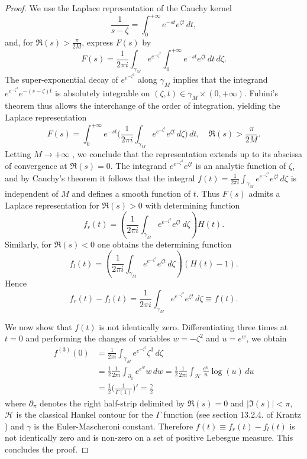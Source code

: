 \documentclass[12pt]{article}
\theoremstyle{definition}
\begin{document}
\begin{proof}
    
We use the Laplace representation of the Cauchy kernel
\[
\frac{1}{s-\zeta}
=
\int_{0}^{+ \infty}e^{-st}e^{\zeta t} \,dt,
\] 
and, for $\Re(s)> \frac{\pi}{2M}$, express $F(s)$ by
\begin{equation*}\label{eq:beforefubini}
    F(s)= \frac{1}{2 \pi i}\int_{\gamma_M}e^{e^{-\zeta^2}}\int_{0}^{+ \infty}e^{-st} e^{\zeta t} \,dt \,d\zeta.
\end{equation*} The super-exponential decay of $e^{e^{-\zeta^2}}$ along $\gamma_M$ implies that the integrand \(e^{e^{- \zeta^2}}e^{-(s-\zeta)t}\) is absolutely integrable on \((\zeta, t) \in \gamma_M \times (0,+ \infty).\) 
Fubini's theorem thus allows the interchange of the order of integration, yielding the Laplace representation  
\begin{equation*}\label{eq:pi2M}
F(s)= \int_{0}^{+ \infty}e^{-st} \Bigg ( \frac{1}{2 \pi i} \int_{\gamma_M} e^{e^{- \zeta^2}}e^{\zeta t} \,d \zeta \Bigg )\,dt, \quad \Re(s)> \frac{\pi}{2M}.
\end{equation*}
Letting $M \to +\infty$ , we conclude that the representation extends up to its abscissa of convergence at $\Re(s)=0.$ The integrand $ e^{e^{- \zeta^2}}e^{\zeta t}$ is an analytic function of $\zeta$, and by Cauchy's theorem it follows that the integral $\displaystyle{f(t)=\frac{1}{2 \pi i} \int_{\gamma_M} e^{e^{- \zeta^2}}e^{\zeta t} \,d \zeta}$ is independent of $M$ and defines a smooth function of $t.$
Thus $F(s)$ admits a Laplace representation for $\Re(s)>0$ with determining function
\[
f_r(t)=  \left( \frac{1}{2 \pi i} \int_{\gamma_M} e^{e^{- \zeta^2}}e^{\zeta t} \,d\zeta  \right)H(t).
\]
Similarly, for $\Re(s)<0$ one obtains the determining function
\[
f_l(t)= \left(\frac{1}{2 \pi i} \int_{\gamma_M} e^{e^{- \zeta^2}}e^{\zeta t} \,d\zeta \right)(H(t)-1).
\]
Hence
\[
f_r(t)-f_l(t)= \frac{1}{2 \pi i} \int_{\gamma_M}e^{e^{-\zeta^2}}e^{\zeta t} \,d\zeta \equiv f(t).
\]

We now show that $f(t)$ is not identically zero. Differentiating three times at $t=0$ and performing the changes of variables $w=-\zeta^2$ and $u=e^w$, we obtain
 \begin{align*}f^{(3)}(0)&=\frac{1}{2 \pi i} \int_{\gamma_M}e^{e^{- \zeta^2}}\zeta^3 \,d\zeta \\
        & = \frac{1}{2}\frac{1}{2\pi i}\int_{\partial_{\pi}}e^{e^{w}}w \,dw= \frac{1}{2}\frac{1}{2 \pi i}\int_{\mathcal{H}}\frac{e^u}{u}\log(u) \,du \\& = \frac{1}{2}\bigg(\frac{1}{\Gamma(1)} \bigg)'=\frac{\gamma}{2}\end{align*} where $\partial_\pi$ denotes the right half-strip delimited by $\Re(s)=0$ and $|\Im(s)|< \pi,$ \(\mathcal{H}\) is the classical Hankel contour for the $\Gamma$ function (see section 13.2.4. of Krantz \cite{Krantz}) and $\gamma$ is the Euler-Mascheroni constant. 
Therefore $f(t) \equiv f_r(t)-f_l(t)$ is not identically zero and is non-zero on a set of positive Lebesgue measure. This concludes the proof.

\end{proof}
\end{document}

